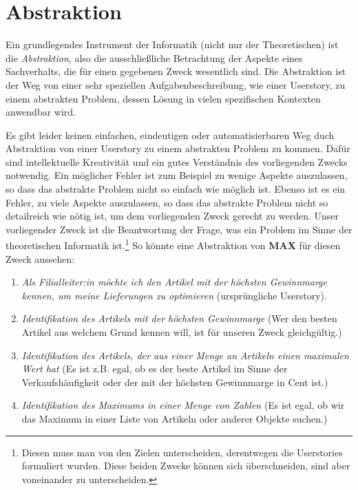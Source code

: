 \section{Abstraktion}

Ein grundlegendes Instrument der Informatik (nicht nur der Theoretischen) 
ist die \emph{Abstraktion},
also die ausschließliche Betrachtung der Aspekte eines Sachverhalts,
die für einen gegebenen Zweck wesentlich sind.
Die Abstraktion ist der Weg von einer sehr speziellen Aufgabenbeschreibung,
wie einer Userstory, zu einem abstrakten Problem,
dessen Lösung in vielen spezifischen Kontexten anwendbar wird.

Es gibt leider keinen einfachen, eindeutigen oder automatisierbaren Weg
duch Abstraktion von einer Userstory zu einem abstrakten Problem zu kommen.
Dafür sind intellektuelle Kreativität
und ein gutes Verständnis des vorliegenden Zwecks notwendig.
Ein möglicher Fehler ist zum Beispiel zu wenige Aspekte auszulassen,
so dass das abstrakte Problem nicht so einfach wie möglich ist. 
Ebenso ist es ein Fehler, zu viele Aspekte auszulassen,
so dass das abstrakte Problem nicht so detailreich wie nötig ist,
um dem vorliegenden Zweck gerecht zu werden.
Unser vorliegender Zweck ist die Beantwortung der Frage,
was ein Problem im Sinne der theoretischen Informatik ist.\footnote{
    Diesen muss man von den Zielen unterscheiden,
    derentwegen die Userstories formuliert wurden.
    Diese beiden Zwecke können sich überschneiden,
    sind aber voneinander zu unterscheiden.
}
So könnte eine Abstraktion von \textbf{MAX} für diesen Zweck aussehen:
\begin{enumerate}
    \item \emph{Als Filialleiter:in möchte ich den Artikel mit der höchsten Gewinnmarge kennen,
        um meine Lieferungen zu optimieren} (ursprüngliche Userstory).
    \item \emph{Identifikation des Artikels mit der höchsten Gewinnmarge}
        (Wer den besten Artikel aus welchem Grund kennen will,
        ist für unseren Zweck gleichgültig.)
    \item \emph{Identifikation des Artikels,
        der aus einer Menge an Artikeln einen maximalen Wert hat}
        (Es ist z.B. egal,
        ob es der beste Artikel im Sinne der Verkaufshäufigkeit
        oder der mit der höchsten Gewinnmarge in Cent ist.)
    \item \emph{Identifikation des Maximums in einer Menge von Zahlen}
        (Es ist egal, ob wir das Maximum in einer Liste von Artikeln
        oder anderer Objekte suchen.)
\end{enumerate}


